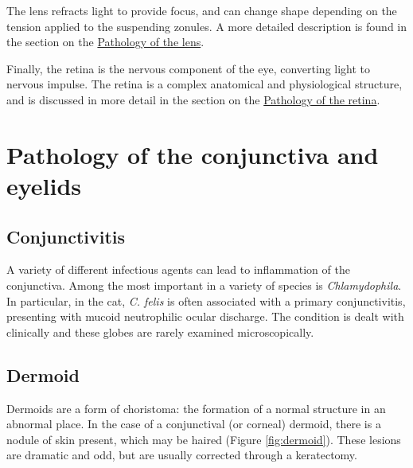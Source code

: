 \documentclass[openany]{book}
\begin{document}
The lens refracts light to provide focus, and can change shape depending
on the tension applied to the suspending zonules. A more detailed
description is found in the section on the
\protect\hyperlink{pathology-of-the-lens}{Pathology of the lens}.

Finally, the retina is the nervous component of the eye, converting
light to nervous impulse. The retina is a complex anatomical and
physiological structure, and is discussed in more detail in the section
on the \protect\hyperlink{pathology-of-the-retina}{Pathology of the
retina}.

\chapter{Pathology of the conjunctiva and
eyelids}\label{pathology-of-the-conjunctiva-and-eyelids}

\section{Conjunctivitis}\label{conjunctivitis}

A variety of different infectious agents can lead to inflammation of the
conjunctiva. Among the most important in a variety of species is
\emph{Chlamydophila}. In particular, in the cat, \emph{C. felis} is
often associated with a primary conjunctivitis, presenting with mucoid
neutrophilic ocular discharge. The condition is dealt with clinically
and these globes are rarely examined microscopically.

\section{Dermoid}\label{dermoid}

Dermoids are a form of choristoma: the formation of a normal structure
in an abnormal place. In the case of a conjunctival (or corneal)
dermoid, there is a nodule of skin present, which may be haired (Figure
\ref{fig:dermoid}). These lesions are dramatic and odd, but are usually
corrected through a keratectomy.
\end{document}
